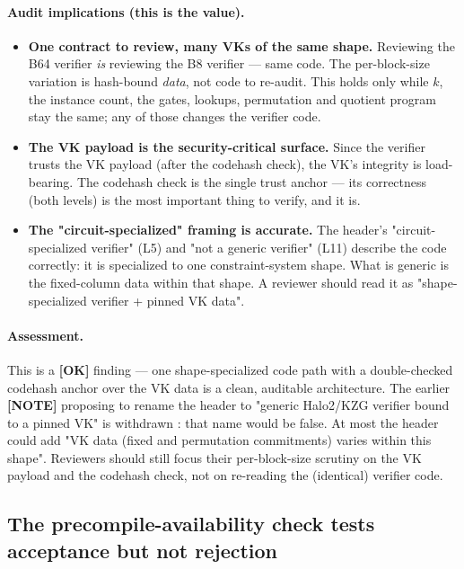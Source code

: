 \paragraph{Audit implications (this is the value).}
\begin{itemize}[leftmargin=1.4em,itemsep=2pt]
\item \textbf{One contract to review, many VKs of the same shape.} Reviewing the
  B64 verifier \emph{is} reviewing the B8 verifier --- same
  code. The per-block-size variation is hash-bound \emph{data}, not
  code to re-audit. This holds only while $k$, the instance count,
  the gates, lookups, permutation and quotient program stay the
  same; any of those changes the verifier code.
\item \textbf{The VK payload is the security-critical surface.}
  Since the verifier trusts the VK payload (after the codehash
  check), the VK's integrity is load-bearing. The codehash check
  is the single trust anchor --- its correctness (both levels) is
  the most important thing to verify, and it is.
\item \textbf{The "circuit-specialized" framing is accurate.}
   The header's "circuit-specialized verifier"
  (L5) and "not a generic verifier" (L11) describe the code
  correctly: it is specialized to one constraint-system shape.
  What is generic is the fixed-column data within that shape. A
  reviewer should read it as "shape-specialized verifier + pinned
  VK data".
\end{itemize}

\paragraph{Assessment.} This is a
\textcolor{tracegreen}{\textbf{[OK]}} finding --- one
shape-specialized code path with a double-checked codehash anchor
over the VK data is a clean, auditable architecture. The earlier
\textcolor{mathpurple}{\textbf{[NOTE]}} proposing to rename the
header to "generic Halo2/KZG verifier bound to a pinned VK" is
withdrawn : that name would be false. At most
the header could add "VK data (fixed and permutation commitments)
varies within this shape". Reviewers should still focus their
per-block-size scrutiny on the VK payload and the codehash check,
not on re-reading the (identical) verifier code.

\subsection{The precompile-availability check tests acceptance but not rejection}
\label{sec:pr-precompile-negative}

